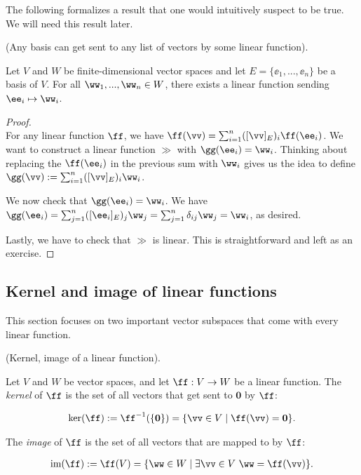 The following formalizes a result that one would intuitively suspect to be true. We will need this result later.

\begin{theorem}
\label{ch::lin_alg::thm::basis_sent_to_any_ordered_list}
    (Any basis can get sent to any list of vectors by some linear function).
    
    Let $V$ and $W$ be finite-dimensional vector spaces and let $E = \{\ee_1, ..., \ee_n\}$ be a basis of $V$. For all ${\ww_1, ..., \ww_n \in W}$, there exists a linear function sending $\ee_i \mapsto \ww_i$.
\end{theorem}

\begin{proof} \mbox{} \\ \indent
    For any linear function $\ff$, we have $\ff(\vv) = \sum_{i = 1}^n ([\vv]_E)_i \ff(\ee_i)$. We want to construct a linear function $\gg$ with $\gg(\ee_i) = \ww_i$. Thinking about replacing the $\ff(\ee_i)$ in the previous sum with $\ww_i$ gives us the idea to define $\gg(\vv) := \sum_{i = 1}^n ([\vv]_E)_i \ww_i$. 
    
    We now check that $\gg(\ee_i) = \ww_i$. We have $\gg(\ee_i) = \sum_{j = 1}^n ([\ee_i]_E)_j \ww_j = \sum_{j = 1}^n \delta_{ij} \ww_j = \ww_i$, as desired. 
    
    Lastly, we have to check that $\gg$ is linear. This is straightforward and left as an exercise.
\end{proof}

\newpage

\subsection*{Kernel and image of linear functions}

This section focuses on two important vector subspaces that come with every linear function.

\begin{defn}
    (Kernel, image of a linear function).
    
    Let $V$ and $W$ be vector spaces, and let $\ff:V \rightarrow W$ be a linear function. The \textit{kernel} of $\ff$ is the set of all vectors that get sent to $\mathbf{0}$ by $\ff$:
    
    \begin{align*}
        \ker(\ff) := \ff^{-1}(\{\mathbf{0}\}) = \{ \vv \in V \mid \ff(\vv) = \mathbf{0} \}.
    \end{align*}
    
    The \textit{image} of $\ff$ is the set of all vectors that are mapped to by $\ff$:
    
    \begin{align*}
        \im(\ff) := \ff(V) = \{ \ww \in W \mid \exists \vv \in V \spc \ww = \ff(\vv) \}.
    \end{align*}
\end{defn}

